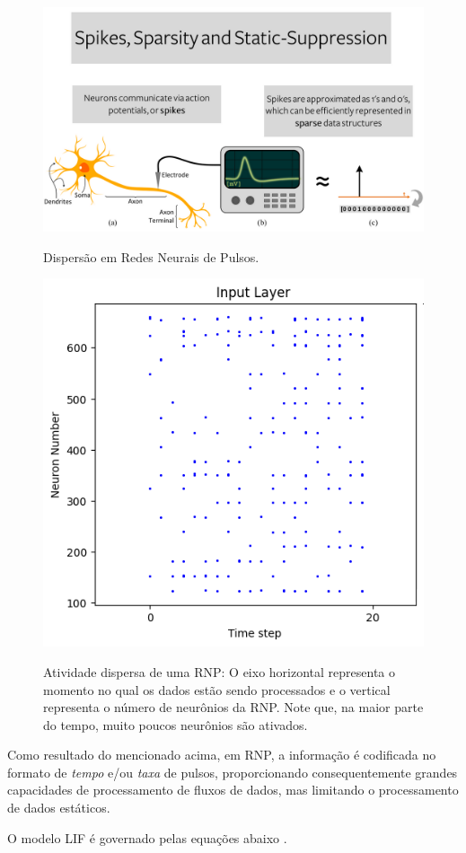 			\begin{figure}[H]
				\centering
				\caption{Dispersão em Redes Neurais de Pulsos.}
				\includegraphics[width=.8\linewidth]{images/spikesSparsityStaticSupress}
				\label{fig:pulsossparsitystaticsupress}
			\end{figure}
			
			\begin{figure}[H]
				\centering
				\caption[Atividade dispersa de uma RNP]{Atividade dispersa de uma RNP: O eixo horizontal representa o momento no qual os dados estão sendo processados e o vertical representa o número de neurônios da RNP. Note que, na maior parte do tempo, muito poucos neurônios são ativados.}
				\includegraphics[width=.4\linewidth]{images/sparsity}
				\label{fig:sparsity}
			\end{figure}
						
			\par Como resultado do mencionado acima, em RNP, a informação é codificada no formato de \textit{tempo} e/ou \textit{taxa} de pulsos, proporcionando consequentemente grandes capacidades de processamento de fluxos de dados, mas limitando o processamento de dados estáticos.
			
			\par O modelo LIF é governado pelas equações abaixo \cite{10242251}.
			

